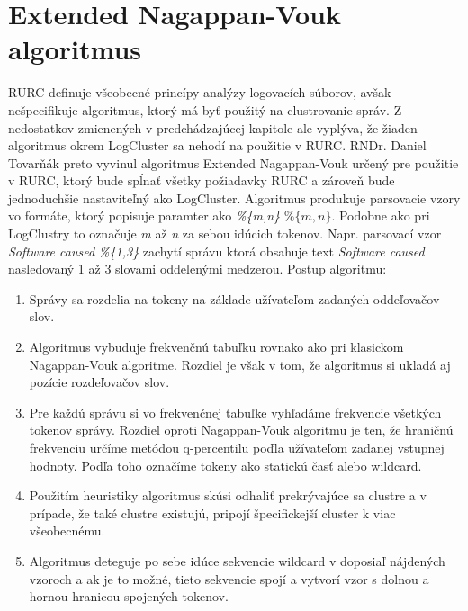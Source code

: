 \section{Extended Nagappan-Vouk algoritmus}
\label{sec:eng}
RURC definuje všeobecné princípy analýzy logovacích súborov, avšak nešpecifikuje algoritmus, ktorý má byť použitý na clustrovanie správ.
Z nedostatkov zmienených v predchádzajúcej kapitole ale vyplýva, že žiaden algoritmus okrem LogCluster sa nehodí na použitie v RURC.
RNDr. Daniel Tovarňák preto vyvinul algoritmus Extended Nagappan-Vouk určený pre použitie v RURC, ktorý bude spĺnať všetky požiadavky RURC a zároveň bude jednoduchšie nastaviteľný ako LogCluster. Algoritmus produkuje parsovacie vzory vo formáte, ktorý popisuje paramter ako \emph{\%\{m,n\}} $\%\{m,n\}$. Podobne ako pri LogClustry to označuje \emph{m} až \emph{n} za sebou idúcich tokenov. Napr. parsovací vzor \emph{Software caused \%\{1,3\}} zachytí správu ktorá obsahuje text \emph{Software caused} nasledovaný 1 až 3 slovami oddelenými medzerou. Postup algoritmu:

\begin{enumerate}
 \item Správy sa rozdelia na tokeny na základe užívateľom zadaných oddeľovačov slov.
 \item Algoritmus vybuduje frekvenčnú tabuľku rovnako ako pri klasickom Nagappan-Vouk algoritme. Rozdiel je však v tom, že algoritmus si ukladá aj pozície rozdeľovačov slov.
 \item Pre každú správu si vo frekvenčnej tabuľke vyhľadáme frekvencie všetkých tokenov správy. Rozdiel oproti Nagappan-Vouk algoritmu je ten, že hraničnú frekvenciu určíme metódou q-percentilu poďla užívateľom zadanej vstupnej hodnoty. Podľa toho označíme tokeny ako statickú časť alebo wildcard.
 \item Použitím heuristiky algoritmus skúsi odhaliť prekrývajúce sa clustre a v prípade, že také clustre existujú, pripojí špecifickejší cluster k viac všeobecnému.
 \item Algoritmus deteguje po sebe idúce sekvencie wildcard v doposiaľ nájdených vzoroch a ak je to možné, tieto sekvencie spojí a vytvorí
 vzor s dolnou a hornou hranicou spojených tokenov.
\end{enumerate}

